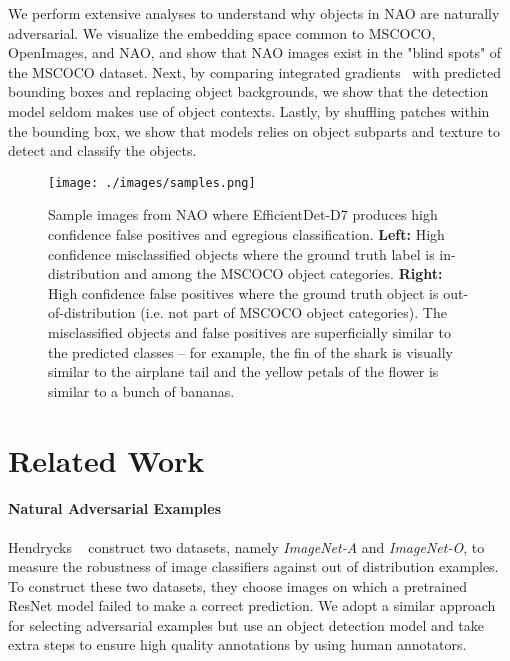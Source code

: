 \documentclass[final]{cvpr}
\begin{document}
We perform extensive analyses to understand why objects in NAO are naturally adversarial. We visualize the embedding space common to MSCOCO, OpenImages, and NAO, and show that NAO images exist in the "blind spots" of the MSCOCO dataset. Next, by comparing integrated gradients~\cite{Sundararajan2017-jl} with predicted bounding boxes and replacing object backgrounds, we show that the detection model seldom makes use of object contexts. Lastly, by shuffling patches within the bounding box, we show that models relies on object subparts and texture to detect and classify the objects.

\begin{figure*}[t]
\begin{center}
   \texttt{[image: ./images/samples.png]}
\end{center}
   \caption{Sample images from NAO where EfficientDet-D7 produces high confidence false positives and egregious classification. \textbf{Left:} High confidence misclassified objects where the ground truth label is in-distribution and among the MSCOCO object categories. \textbf{Right:} High confidence false positives where the ground truth object is out-of-distribution (i.e. not part of MSCOCO object categories). The misclassified objects and false positives are superficially similar to the predicted classes -- for example, the fin of the shark is visually similar to the airplane tail and the yellow petals of the flower is similar to a bunch of bananas.}
\label{fig:long}
\label{fig:onecol}
\label{fig:samples}
\end{figure*}

\section{Related Work}

\paragraph{Natural Adversarial Examples} 

Hendrycks \etal~\cite{Hendrycks2019-cn} construct two datasets, namely \textit{ImageNet-A} and \textit{ImageNet-O}, to measure the robustness of image classifiers against out of distribution examples.  To construct these two datasets, they choose images on which a pretrained ResNet model failed to make a correct prediction. We adopt a similar approach for selecting adversarial examples but use an object detection model and take extra steps to ensure high quality annotations by using human annotators.
\end{document}
